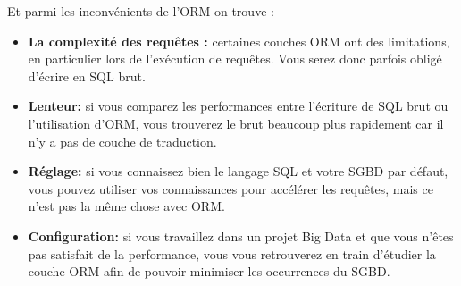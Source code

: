 \bigskip

Et parmi les inconv\'{e}nients de l'ORM on trouve :



\bigskip

\begin{itemize}
\item{\textbf{ La complexit\'{e} des requ\^{e}tes : }certaines couches ORM ont des limitations, en
particulier lors de l'ex\'{e}cution de requ\^{e}tes. Vous serez donc parfois oblig\'{e}
d'\'{e}crire en SQL brut.}

\item{\textbf{Lenteur:}
 si vous comparez les performances entre l'\'{e}criture de SQL brut ou
l'utilisation d'ORM, vous trouverez le brut beaucoup plus rapidement car il
n'y a pas de couche de traduction.}

\item{\textbf{R\'{e}glage:} si vous connaissez bien le langage SQL et votre SGBD par d\'{e}faut,
vous pouvez utiliser vos connaissances pour acc\'{e}l\'{e}rer les requ\^{e}tes, mais ce
n'est pas la m\^{e}me chose avec ORM.}

\item{\textbf{Configuration:}
 si vous travaillez dans un projet Big Data et que vous n'\^{e}tes
pas satisfait de la performance, vous vous retrouverez en train d'\'{e}tudier la
couche ORM afin de pouvoir minimiser les occurrences du SGBD.}



\end{itemize}